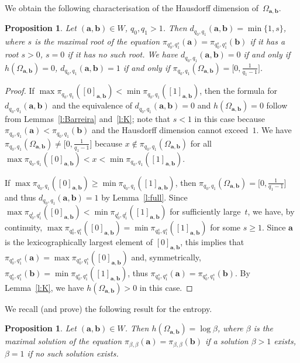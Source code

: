 \documentclass{amsart}
\newtheorem{proposition}[theorem]{Proposition}
\theoremstyle{definition}
\numberwithin{equation}{section}
\newcommand{\ba}{\mathbf{a}}
\newcommand{\bb}{\mathbf{b}}
\begin{document}
We obtain the following characterisation of the Hausdorff dimension of~$\Omega_{\ba,\bb}$. 

\begin{proposition} \label{p:K}
Let $(\ba,\bb) \in W$, $q_0,q_1>1$.
Then $d_{q_0,q_1}(\ba,\bb) = \min\{1,s\}$, where $s$ is the maximal root of the equation $\pi_{q_0^s,q_1^s}(\ba) = \pi_{q_0^s,q_1^s}(\bb)$ if it has a root $s > 0$, $s = 0$ if it has no such root.
We have $d_{q_0,q_1}(\ba,\bb) = 0$ if and only if $h(\Omega_{\ba,\bb}) = 0$, $d_{q_0,q_1}(\ba,\bb) = 1$ if and only if $\pi_{q_0,q_1}(\Omega_{\ba,\bb}) = \big[0,\frac{1}{q_1-1}\big]$.
\end{proposition}

\begin{proof}
  If $\max \pi_{q_0,q_1}([0]_{\ba,\bb}) < \min \pi_{q_0,q_1}([1]_{\ba,\bb})$, then the formula for $d_{q_0,q_1}(\ba,\bb)$ and the equivalence of $d_{q_0,q_1}(\ba,\bb) = 0$ and $h(\Omega_{\ba,\bb}) = 0$ follow from Lemmas~\ref{l:Barreira} and~\ref{l:K}; note that $s < 1$ in this case because $\pi_{q_0,q_1}(\ba) < \pi_{q_0,q_1}(\bb)$ and the Hausdorff dimension cannot exceed~$1$.
We have $\pi_{q_0,q_1}(\Omega_{\ba,\bb}) \ne \big[0,\frac{1}{q_1-1}\big]$ because $x \notin \pi_{q_0,q_1}(\Omega_{\ba,\bb})$ for all $\max \pi_{q_0,q_1}([0]_{\ba,\bb}) < x < \min \pi_{q_0,q_1}([1]_{\ba,\bb})$.

If $\max \pi_{q_0,q_1}([0]_{\ba,\bb}) \ge \min \pi_{q_0,q_1}([1]_{\ba,\bb})$, then $\pi_{q_0,q_1}(\Omega_{\ba,\bb}) = \big[0,\frac{1}{q_1-1}\big]$ and thus $d_{q_0,q_1}(\ba,\bb) = 1$ by Lemma~\ref{l:full}.
Since $\max \pi_{q_0^t,q_1^t}([0]_{\ba,\bb}) < \min \pi_{q_0^t,q_1^t}([1]_{\ba,\bb})$ for sufficiently large~$t$, we have, by continuity, $\max \pi_{q_0^s,q_1^s}([0]_{\ba,\bb}) = \min \pi_{q_0^s,q_1^s}([1]_{\ba,\bb})$ for some $s \ge 1$.
Since $\ba$ is the lexicographically largest element of $[0]_{\ba,\bb}$, this implies that $\pi_{q_0^s,q_1^s}(\ba) = \max \pi_{q_0^s,q_1^s}([0]_{\ba,\bb})$ and, symmetrically, $\pi_{q_0^s,q_1^s}(\bb) = \min \pi_{q_0^s,q_1^s}([1]_{\ba,\bb})$, thus $\pi_{q_0^s,q_1^s}(\ba) = \pi_{q_0^s,q_1^s}(\bb)$.
By Lemma~\ref{l:K}, we have $h(\Omega_{\ba,\bb}) > 0$ in this case.
\end{proof}

We recall (and prove) the following result for the entropy.

\begin{proposition} \label{p:entropy}
Let $(\ba,\bb) \in W$.
Then $h(\Omega_{\ba,\bb}) = \log \beta$, where $\beta$ is the maximal solution of the equation $\pi_{\beta,\beta}(\ba) = \pi_{\beta,\beta}(\bb)$ if a solution $\beta > 1$ exists, $\beta = 1$ if no such solution exists. 
\end{proposition}
\end{document}
